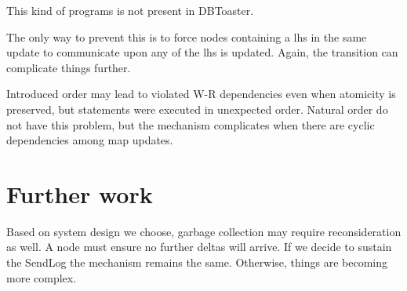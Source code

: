 \documentclass{sig-semester}
\begin{document}
This kind of programs is not present in DBToaster.

The only way to prevent this is to force nodes containing a lhs in the same update to communicate upon any of the lhs is updated. Again, the transition can complicate things further.

Introduced order may lead to violated W-R dependencies even when atomicity is preserved, but statements were executed in unexpected order. Natural order do not have this problem, but the mechanism complicates when there are cyclic dependencies among map updates.

\section{Further work} Based on system design we choose, garbage collection may require reconsideration as well. A node must ensure no further deltas will arrive. If we decide to sustain the SendLog the mechanism remains the same. Otherwise, things are becoming more complex.

%
%

\newpage
\end{document}
